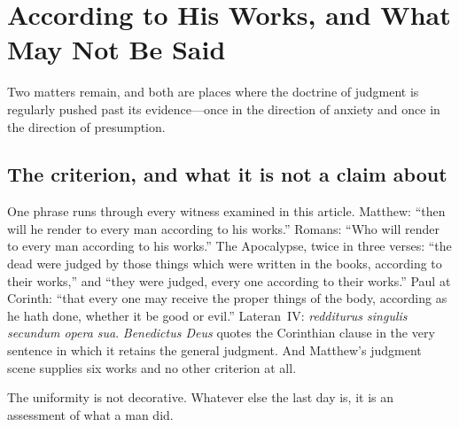 \section{According to His Works, and What May Not Be Said}\label{sec:works}

Two matters remain, and both are places where the doctrine of judgment is regularly pushed past its evidence---once in the direction of anxiety and once in the direction of presumption.

\subsection{The criterion, and what it is not a claim about}

One phrase runs through every witness examined in this article. Matthew: ``then will he render to every man according to his works.'' Romans: ``Who will render to every man according to his works.'' The Apocalypse, twice in three verses: ``the dead were judged by those things which were written in the books, according to their works,'' and ``they were judged, every one according to their works.'' Paul at Corinth: ``that every one may receive the proper things of the body, according as he hath done, whether it be good or evil.'' Lateran~IV: \emph{redditurus singulis secundum opera sua}. \emph{Benedictus Deus} quotes the Corinthian clause in the very sentence in which it retains the general judgment. And Matthew's judgment scene supplies six works and no other criterion at all.

The uniformity is not decorative. Whatever else the last day is, it is an assessment of what a man did.

